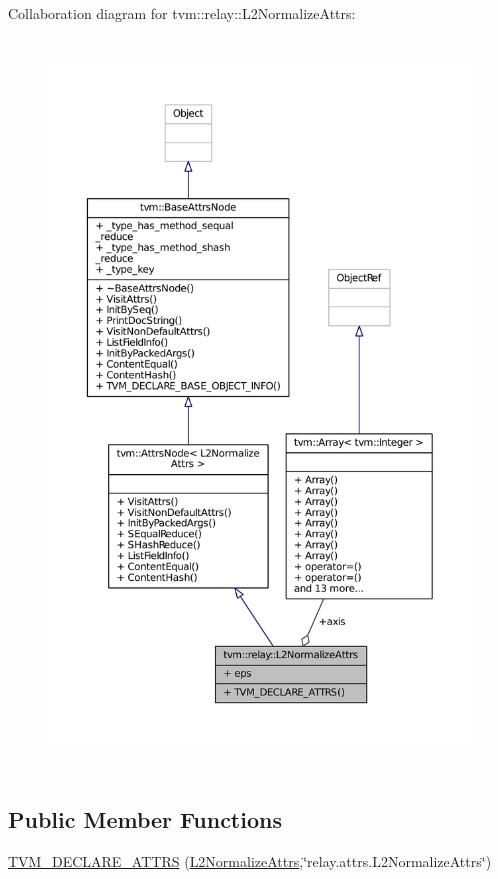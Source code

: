 Collaboration diagram for tvm\+:\+:relay\+:\+:L2\+Normalize\+Attrs\+:
\nopagebreak
\begin{figure}[H]
\begin{center}
\leavevmode
\includegraphics[height=550pt]{structtvm_1_1relay_1_1L2NormalizeAttrs__coll__graph}
\end{center}
\end{figure}
\subsection*{Public Member Functions}
\begin{DoxyCompactItemize}
\item 
\hyperlink{structtvm_1_1relay_1_1L2NormalizeAttrs_a8846fb06eb7489779dc6c663c3189126}{T\+V\+M\+\_\+\+D\+E\+C\+L\+A\+R\+E\+\_\+\+A\+T\+T\+RS} (\hyperlink{structtvm_1_1relay_1_1L2NormalizeAttrs}{L2\+Normalize\+Attrs},\char`\"{}relay.\+attrs.\+L2\+Normalize\+Attrs\char`\"{})
\end{DoxyCompactItemize}
